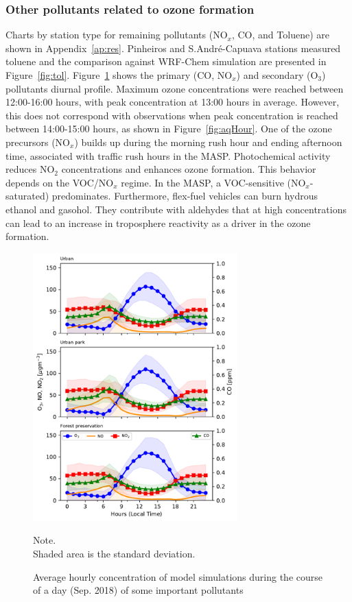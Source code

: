 \subsubsection{Other pollutants related to ozone formation} 
Charts by station type for remaining pollutants (NO$_x$, CO, and Toluene) are shown in Appendix~\ref{ap:res}.
Pinheiros and S.André-Capuava stations measured toluene and the comparison against WRF-Chem simulation are presented in Figure~\ref{fig:tol}.
Figure~\ref{fig: Variation_pol_day} shows the primary (CO, NO$_x$) and secondary (O$_3$) pollutants diurnal profile.
Maximum ozone concentrations were reached between 12:00-16:00 hours, with peak concentration at 13:00 hours in average.
However, this does not correspond with observations when peak concentration is reached between 14:00-15:00 hours, as shown in Figure~\ref{fig:aqHour}.
One of the ozone precursors (NO$_x$) builds up during the morning rush hour and ending afternoon time, associated with traffic rush hours in the MASP.
Photochemical activity reduces NO$_2$ concentrations and enhances ozone formation.
This behavior depends on the VOC/NO$_x$ regime.
In the MASP, a VOC-sensitive (NO$_x$-saturated) predominates.
Furthermore, flex-fuel vehicles can burn hydrous ethanol and gasohol.
They contribute with aldehydes \citep{Nogueira2014} that at high concentrations can lead to an increase in troposphere reactivity as a driver in the ozone formation.

\begin{figure}[!hbt]
	\begin{center}
		\includegraphics[width=0.7\textwidth]{fig/Variation_pol_day}
	\end{center}
  \caption{Average hourly concentration of model simulations during the course of a day (Sep. 2018) of some important pollutants}
  {\scriptsize Note.\\ Shaded area is the standard deviation.}
  \label{fig: Variation_pol_day}
\end{figure}

